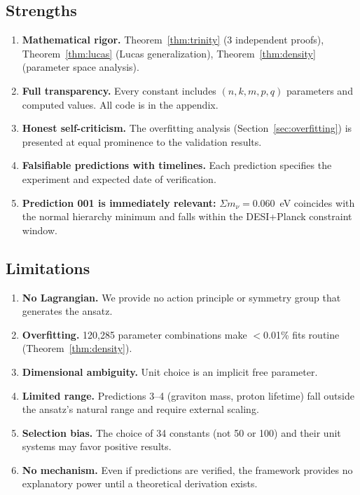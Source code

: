 \documentclass[aps,prd,preprint,superscriptaddress,showpacs,nofootinbib,longbibliography]{revtex4-2}
\begin{document}
\subsection{Strengths}

\begin{enumerate}[itemsep=2pt]
    \item \textbf{Mathematical rigor.} Theorem~\ref{thm:trinity} (3 independent proofs), Theorem~\ref{thm:lucas} (Lucas generalization), Theorem~\ref{thm:density} (parameter space analysis).
    
    \item \textbf{Full transparency.} Every constant includes $(n,k,m,p,q)$ parameters and computed values. All code is in the appendix.
    
    \item \textbf{Honest self-criticism.} The overfitting analysis (Section~\ref{sec:overfitting}) is presented at equal prominence to the validation results.
    
    \item \textbf{Falsifiable predictions with timelines.} Each prediction specifies the experiment and expected date of verification.
    
    \item \textbf{Prediction 001 is immediately relevant:} $\Sigma m_\nu = 0.060$~eV coincides with the normal hierarchy minimum and falls within the DESI+Planck constraint window.
\end{enumerate}

\subsection{Limitations}
\label{sec:limitations}

\begin{enumerate}[itemsep=2pt]
    \item \textbf{No Lagrangian.} We provide no action principle or symmetry group that generates the ansatz.
    \item \textbf{Overfitting.} 120,285 parameter combinations make $<$0.01\% fits routine (Theorem~\ref{thm:density}).
    \item \textbf{Dimensional ambiguity.} Unit choice is an implicit free parameter.
    \item \textbf{Limited range.} Predictions 3--4 (graviton mass, proton lifetime) fall outside the ansatz's natural range and require external scaling.
    \item \textbf{Selection bias.} The choice of 34 constants (not 50 or 100) and their unit systems may favor positive results.
    \item \textbf{No mechanism.} Even if predictions are verified, the framework provides no explanatory power until a theoretical derivation exists.
\end{enumerate}
\end{document}
